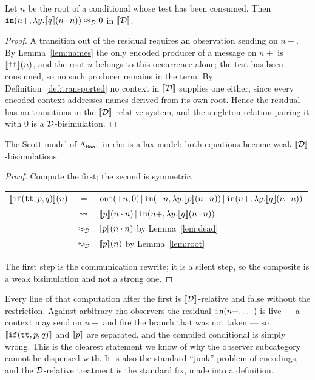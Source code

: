 \documentclass{article}
\begin{document}
\begin{lemma}
\label{lem:dead}
    Let $n$ be the root of a conditional whose test has been consumed. Then $\mathtt{in}(n+,\lambda y.[\![q]\!](n\cdot n))\approx_{\mathcal{D}} 0$ in $[\![\mathcal{D}]\!]$.
\end{lemma}
\begin{proof}
    A transition out of the residual requires an observation sending on $n+$. By Lemma~\ref{lem:names} the only encoded producer of a message on $n+$ is $[\![\mathtt{ff}]\!](n)$, and the root $n$ belongs to this occurrence alone; the test has been consumed, so no such producer remains in the term. By Definition~\ref{def:transported} no context in $[\![\mathcal{D}]\!]$ supplies one either, since every encoded context addresses names derived from its own root. Hence the residual has no transitions in the $[\![\mathcal{D}]\!]$-relative system, and the singleton relation pairing it with $0$ is a $\mathcal{D}$-bisimulation.
\end{proof}

\begin{proposition}
\label{prop:bool}
    The Scott model of $\mathrm{A}_{\mathtt{Bool}}$ in rho is a lax model: both equations become weak $[\![\mathcal{D}]\!]$-bisimulations.
\end{proposition}
\begin{proof}
    Compute the first; the second is symmetric.
    \begin{center}
    \renewcommand{\arraystretch}{1.3}
    \begin{tabular}{rcl}
        $[\![\mathtt{if}(\mathtt{tt},p,q)]\!](n)$ & $=$ & $\mathtt{out}(+n,0)\,|\, \mathtt{in}(+n,\lambda y.[\![p]\!](n\cdot n))\,|\,\mathtt{in}(n+,\lambda y.[\![q]\!](n\cdot n))$\\
        & $\rightsquigarrow$ & $[\![p]\!](n\cdot n)\,|\,\mathtt{in}(n+,\lambda y.[\![q]\!](n\cdot n))$\\
        & $\approx_{\mathcal{D}}$ & $[\![p]\!](n\cdot n)$ \qquad by Lemma~\ref{lem:dead}\\
        & $\approx_{\mathcal{D}}$ & $[\![p]\!](n)$ \qquad by Lemma~\ref{lem:root}
    \end{tabular}
    \end{center}
    The first step is the communication rewrite; it is a silent step, so the composite is a weak bisimulation and not a strong one.
\end{proof}

\begin{remark}
    Every line of that computation after the first is $[\![\mathcal{D}]\!]$-relative and false without the restriction. Against arbitrary rho observers the residual $\mathtt{in}(n+,\dots)$ is live --- a context may send on $n+$ and fire the branch that was not taken --- so $[\![\mathtt{if}(\mathtt{tt},p,q)]\!]$ and $[\![p]\!]$ are separated, and the compiled conditional is simply wrong. This is the clearest statement we know of why the observer subcategory cannot be dispensed with. It is also the standard ``junk'' problem of encodings, and the $\mathcal{D}$-relative treatment is the standard fix, made into a definition.
\end{remark}
\end{document}
